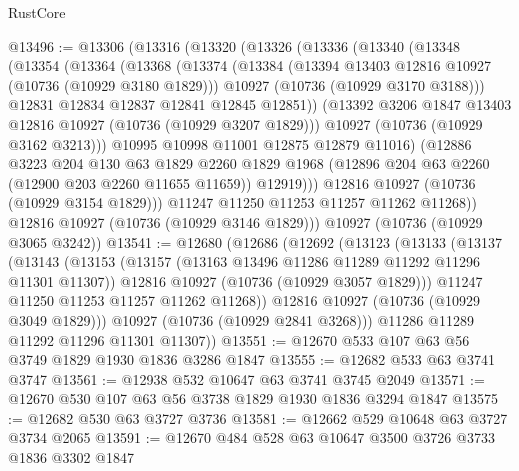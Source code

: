 \begin{lexlean}{RustCore}
\begin{coremodule}
@13496 := @13306
    (@13316
      (@13320
        (@13326
          (@13336
            (@13340
              (@13348
                (@13354
                  (@13364
                    (@13368
                      (@13374
                        (@13384
                          (@13394 @13403 @12816 @10927 (@10736 (@10929 @3180 @1829)))
                          @10927
                          (@10736 (@10929 @3170 @3188)))
                        @12831
                        @12834
                        @12837
                        @12841
                        @12845
                        @12851))
                    (@13392 @3206 @1847 @13403 @12816 @10927 (@10736 (@10929 @3207 @1829)))
                    @10927
                    (@10736 (@10929 @3162 @3213)))
                  @10995
                  @10998
                  @11001
                  @12875
                  @12879
                  @11016)
                (@12886
                  @3223
                  @204
                  @130
                  @63
                  @1829
                  @2260
                  @1829
                  @1968
                  (@12896 @204 @63 @2260 (@12900 @203 @2260 @11655 @11659))
                  @12919)))
            @12816
            @10927
            (@10736 (@10929 @3154 @1829)))
          @11247
          @11250
          @11253
          @11257
          @11262
          @11268))
      @12816
      @10927
      (@10736 (@10929 @3146 @1829)))
    @10927
    (@10736 (@10929 @3065 @3242))
@13541 := @12680
    (@12686
      (@12692
        (@13123
          (@13133
            (@13137
              (@13143
                (@13153
                  (@13157 (@13163 @13496 @11286 @11289 @11292 @11296 @11301 @11307))
                  @12816
                  @10927
                  (@10736 (@10929 @3057 @1829)))
                @11247
                @11250
                @11253
                @11257
                @11262
                @11268))
            @12816
            @10927
            (@10736 (@10929 @3049 @1829)))
          @10927
          (@10736 (@10929 @2841 @3268)))
        @11286
        @11289
        @11292
        @11296
        @11301
        @11307))
@13551 := @12670 @533 @107 @63 @56 @3749 @1829 @1930 @1836 @3286 @1847
@13555 := @12682 @533 @63 @3741 @3747
@13561 := @12938 @532 @10647 @63 @3741 @3745 @2049
@13571 := @12670 @530 @107 @63 @56 @3738 @1829 @1930 @1836 @3294 @1847
@13575 := @12682 @530 @63 @3727 @3736
@13581 := @12662 @529 @10648 @63 @3727 @3734 @2065
@13591 := @12670 @484 @528 @63 @10647 @3500 @3726 @3733 @1836 @3302 @1847

\end{coremodule}
\end{lexlean}
